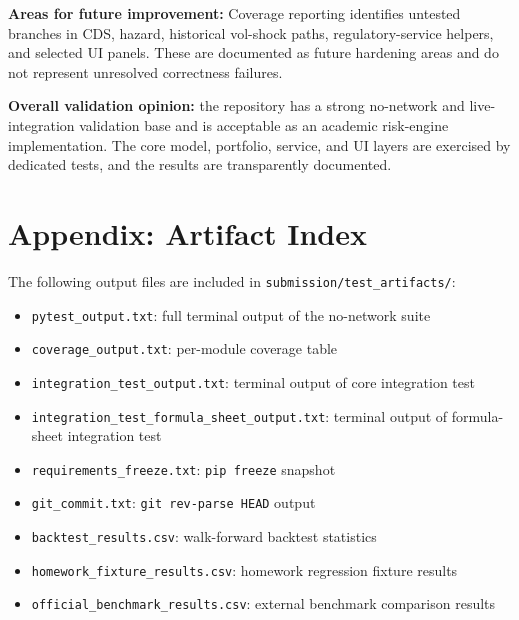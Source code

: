 \documentclass[11pt]{article}
\newcommand{\code}[1]{\texttt{#1}}
\begin{document}
\textbf{Areas for future improvement:}
Coverage reporting identifies untested branches in CDS, hazard,
historical vol-shock paths, regulatory-service helpers, and selected UI
panels.  These are documented as future hardening areas and do not
represent unresolved correctness failures.

\textbf{Overall validation opinion:} the repository has a strong
no-network and live-integration validation base and is acceptable as an
academic risk-engine implementation.  The core model, portfolio, service,
and UI layers are exercised by dedicated tests, and the results are
transparently documented.

\section{Appendix: Artifact Index}

The following output files are included in \code{submission/test\_artifacts/}:

\begin{itemize}
  \item \code{pytest\_output.txt}: full terminal output of the no-network suite
  \item \code{coverage\_output.txt}: per-module coverage table
  \item \code{integration\_test\_output.txt}: terminal output of core integration test
  \item \code{integration\_test\_\allowbreak formula\_sheet\_output.txt}: terminal output of formula-sheet integration test
  \item \code{requirements\_freeze.txt}: \code{pip freeze} snapshot
  \item \code{git\_commit.txt}: \code{git rev-parse HEAD} output
  \item \code{backtest\_results.csv}: walk-forward backtest statistics
  \item \code{homework\_fixture\_\allowbreak results.csv}: homework regression fixture results
  \item \code{official\_benchmark\_\allowbreak results.csv}: external benchmark comparison results
\end{itemize}
\end{document}
